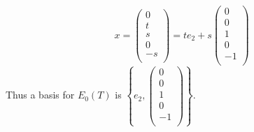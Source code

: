 \documentclass{eh-homework}
\begin{document}
\begin{question}{2}
\begin{enumerate}[label=(\alph*)]
        \[
            x = \begin{pmatrix}
                 0 \\
                 t \\
                 s \\
                 0 \\
                 -s \\
            \end{pmatrix} =
            te_2 + s\begin{pmatrix}
                 0 \\
                 0 \\
                 1 \\
                 0 \\
                 -1 \\
            \end{pmatrix}
        \]
        Thus a basis for \(E_0(T)\) is \( \left\{ e_2, \begin{pmatrix}
             0 \\
             0 \\
             1 \\
             0 \\
             -1 \\
        \end{pmatrix}\right\} \).

        \medskip


\end{enumerate}
\end{question}
\end{document}
